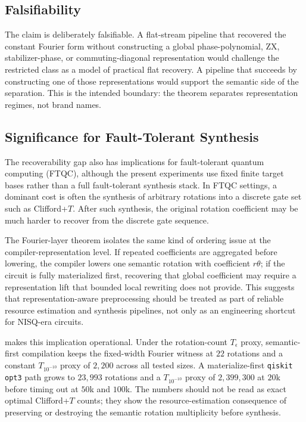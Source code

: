 \documentclass[11pt]{article}
\begin{document}
\subsection{Falsifiability}

The claim is deliberately falsifiable. A flat-stream pipeline that recovered
the constant Fourier form without constructing a global phase-polynomial, ZX,
stabilizer-phase, or commuting-diagonal representation would challenge the
restricted class as a model of practical flat recovery. A pipeline that
succeeds by constructing one of those representations would support the
semantic side of the separation. This is the intended boundary: the theorem
separates representation regimes, not brand names.

\subsection{Significance for Fault-Tolerant Synthesis}

The recoverability gap also has implications for fault-tolerant quantum
computing (FTQC), although the present experiments use fixed finite target
bases rather than a full fault-tolerant synthesis stack. In FTQC settings, a
dominant cost is often the synthesis of arbitrary rotations into a discrete
gate set such as Clifford+$T$. After such synthesis, the original rotation
coefficient may be much harder to recover from the discrete gate sequence.

The Fourier-layer theorem isolates the same kind of ordering issue at the
compiler-representation level. If repeated coefficients are aggregated before
lowering, the compiler lowers one semantic rotation with coefficient
$r\theta$; if the circuit is fully materialized first, recovering that global
coefficient may require a representation lift that bounded local rewriting
does not provide. This suggests that representation-aware preprocessing should
be treated as part of reliable resource estimation and synthesis pipelines, not
only as an engineering shortcut for NISQ-era circuits.

 makes this implication operational. Under the
rotation-count $T_{\epsilon}$ proxy, semantic-first compilation keeps the
fixed-width Fourier witness at $22$ rotations and a constant $T_{10^{-10}}$
proxy of $2{,}200$ across all tested sizes. A materialize-first
\texttt{qiskit opt3} path grows to $23{,}993$ rotations and a $T_{10^{-10}}$
proxy of $2{,}399{,}300$ at $20$k before timing out at $50$k and $100$k. The
numbers should not be read as exact optimal Clifford+$T$ counts; they show the
resource-estimation consequence of preserving or destroying the semantic
rotation multiplicity before synthesis.
\end{document}
